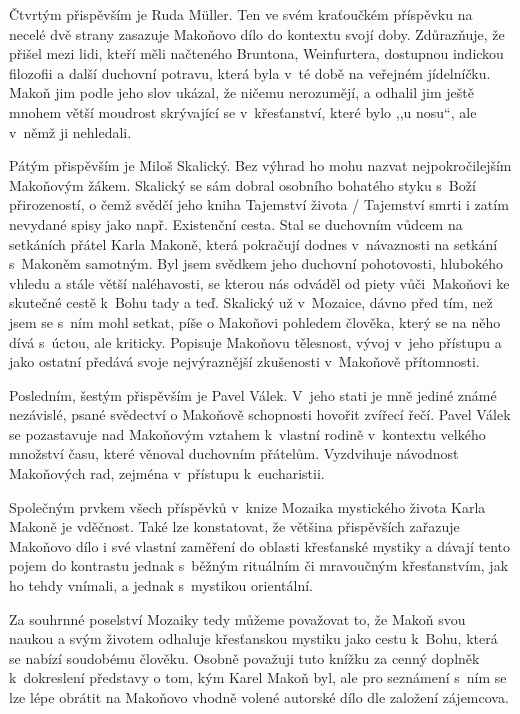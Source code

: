 Čtvrtým přispěvším je Ruda Müller. Ten ve svém kraťoučkém příspěvku na necelé
dvě strany zasazuje Makoňovo dílo do kontextu svojí doby. Zdůrazňuje, že přišel
mezi lidi, kteří měli načteného Bruntona\cite{brunton1951hidden},
Weinfurtera\cite{weinfurter1923ohnivy}, dostupnou indickou
filozofii\cite{weinfurter1935bhagavadgita} a další duchovní potravu, která byla v~té době na veřejném jídelníčku.
Makoň jim podle jeho slov ukázal, že ničemu nerozumějí, a odhalil jim ještě
mnohem větší moudrost skrývající se v~křesťanství, které bylo ,,u nosu``, ale
v~němž ji nehledali.

Pátým přispěvším je Miloš Skalický. Bez výhrad ho mohu nazvat nejpokročilejším
Makoňovým žákem. Skalický se sám dobral osobního bohatého styku s~Boží
přirozeností, o čemž svědčí jeho kniha Tajemství života / Tajemství
smrti\cite{skalicky2022tajemstvi} i zatím nevydané spisy jako např. Existenční
cesta. Stal se duchovním vůdcem na setkáních přátel Karla Makoně, která
pokračují dodnes v~návaznosti na setkání s~Makoněm samotným. Byl jsem svědkem
jeho duchovní pohotovosti, hlubokého vhledu a stále větší naléhavosti, se kterou
nás odváděl od piety vůči~Makoňovi ke skutečné cestě k~Bohu tady a teď. Skalický už
v~Mozaice, dávno před tím, než jsem se s~ním mohl setkat, píše o Makoňovi
pohledem člověka, který se na něho dívá s~úctou, ale kriticky. Popisuje Makoňovu
tělesnost, vývoj v~jeho přístupu a jako ostatní předává svoje nejvýraznější
zkušenosti v~Makoňově přítomnosti.

Posledním, šestým přispěvším je Pavel Válek. V~jeho stati je mně jediné známé
nezávislé, psané svědectví o Makoňově schopnosti hovořit zvířecí řečí. Pavel
Válek se pozastavuje nad Makoňovým vztahem k~vlastní rodině v~kontextu velkého
množství času, které věnoval duchovním přátelům. Vyzdvihuje návodnost Makoňových
rad, zejména v~přístupu k~eucharistii.

Společným prvkem všech příspěvků v~knize Mozaika mystického života Karla Makoně
je vděčnost. Také lze konstatovat, že většina přispěvších zařazuje Makoňovo dílo
i své vlastní zaměření do oblasti křesťanské mystiky a dávají tento pojem do
kontrastu jednak s~běžným rituálním či mravoučným křesťanstvím, jak ho tehdy
vnímali, a jednak s~mystikou orientální.

Za souhrnné poselství Mozaiky tedy můžeme považovat to, že Makoň svou naukou a
svým životem odhaluje křesťanskou mystiku jako cestu k~Bohu, která se nabízí
soudobému člověku. Osobně považuji tuto knížku za cenný doplněk k~dokreslení
představy o tom, kým Karel Makoň byl, ale pro seznámení s~ním se lze lépe
obrátit na Makoňovo vhodně volené autorské dílo dle založení zájemcova.

